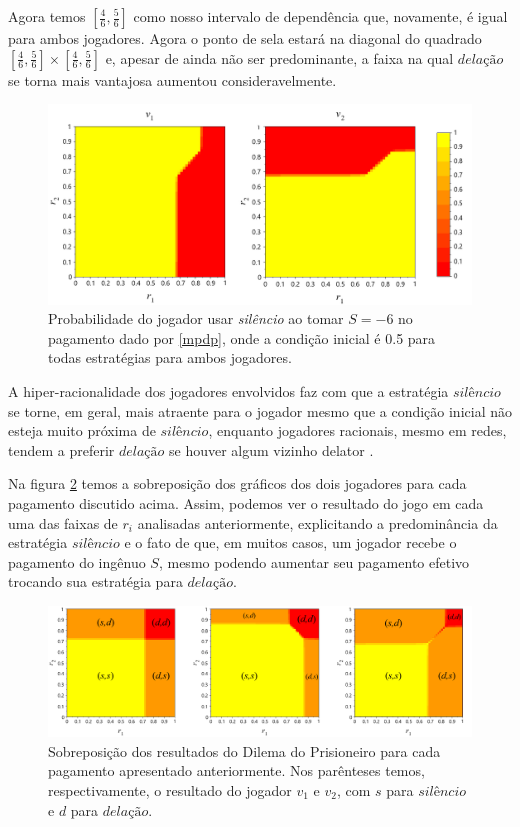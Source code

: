 Agora temos $[\frac{4}{6},\frac{5}{6}]$ como nosso intervalo de dependência que, novamente, é igual para ambos jogadores. Agora o ponto de sela estará na diagonal do quadrado $[\frac{4}{6},\frac{5}{6}]\times[\frac{4}{6},\frac{5}{6}]$ e, apesar de ainda não ser predominante, a faixa na qual $\textit{delação}$ se torna mais vantajosa aumentou consideravelmente.

\begin{figure}[h]
    \caption{Probabilidade do jogador usar \textit{silêncio} ao tomar $S=-6$ no pagamento dado por \ref{mpdp}, onde a condição inicial é 0.5 para todas estratégias para ambos jogadores.}
    \centerline{\includegraphics[scale=0.43]{./img/PD-neg-payoff-inverse-dep.png}}
    \label{fig:pd-neg-payoff-inverse-dep}
\end{figure}

A hiper-racionalidade dos jogadores envolvidos faz com que a estratégia $\textit{silêncio}$ se torne, em geral, mais atraente para o jogador mesmo que a condição inicial não esteja muito próxima de $\textit{silêncio}$, enquanto jogadores racionais, mesmo em redes, tendem a preferir $\textit{delação}$ se houver algum vizinho delator \cite{madeo2015}.

Na figura \ref{fig:sobreposicao} temos a sobreposição dos gráficos dos dois jogadores para cada pagamento discutido acima. Assim, podemos ver o resultado do jogo em cada uma das faixas de $r_i$ analisadas anteriormente, explicitando a predominância da estratégia $\textit{silêncio}$ e o fato de que, em muitos casos, um jogador recebe o pagamento do ingênuo $S$, mesmo podendo aumentar seu pagamento efetivo trocando sua estratégia para $\textit{delação}$.

\begin{figure}[h]
    \caption{Sobreposição dos resultados do Dilema do Prisioneiro para cada pagamento apresentado anteriormente. Nos parênteses temos, respectivamente, o resultado do jogador $v_1$ e $v_2$, com $s$ para $\textit{silêncio}$ e $d$ para $\textit{delação}$.}
    \centerline{\includegraphics[scale=0.0775]{./img/sobreposicao.png}}
    \label{fig:sobreposicao}
\end{figure}

